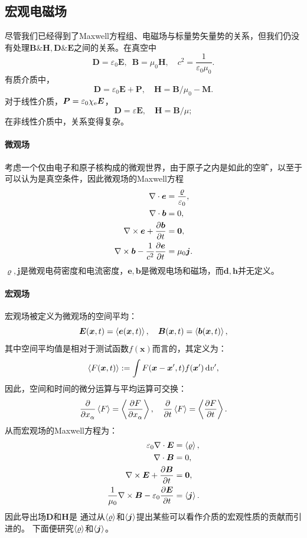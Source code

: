 \subsection{宏观电磁场}
尽管我们已经得到了Maxwell方程组、电磁场与标量势矢量势的关系，但我们仍没有处理$\bm B\&\bm H,\bm D\&\bm E$之间的关系。在真空中
\[
    \bm D=\varepsilon_0\bm E,\enspace\bm B=\mu_0\bm H,\quad c^2=\frac1{\varepsilon_0\mu_0}.
\]
有质介质中，
\[
    \bm D=\varepsilon_0\bm E+\bm P,\quad \bm H=\bm B/\mu_0-\bm M.
\]
对于线性介质，$\bm P=\varepsilon_0\chi_\mathrm e\bm E$，
\[
    \bm D=\varepsilon\bm E,\quad\bm H=\bm B/\mu;
\]
在非线性介质中，关系变得复杂。
\paragraph{微观场}
考虑一个仅由电子和原子核构成的微观世界，由于原子之内是如此的空旷，以至于可以认为是真空条件，因此微观场的Maxwell方程
\begin{align*}
    \div\bm e&=\frac\varrho{\varepsilon_0},\\
    \div\bm b&=0,\\
    \curl\bm e+\pv{\bm b}t&=\bm 0,\\
    \curl\bm b-\frac1{c^2}\pv{\bm e}t&=\mu_0\bm j.
\end{align*}
$\varrho,\bm j$是微观电荷密度和电流密度，$\bm e,\bm b$是微观电场和磁场，而$\bm d,\bm h$并无定义。
\paragraph{宏观场}
宏观场被定义为微观场的空间平均：
\[
    \bm E(\bm x,t)=\left\langle \bm e(\bm x,t)\right\rangle,\quad \bm B(\bm x,t)=\left\langle \bm b(\bm x,t)\right\rangle,
\]
其中空间平均值是相对于测试函数$f(\bm x)$而言的，其定义为：
\[
    \left\langle F(\bm x,t)\right\rangle:=\int F(\bm x-\bm x',t)f(\bm x')\mathop{}\!\mathrm{d} v',
\]
因此，空间和时间的微分运算与平均运算可交换：
\[
    \pp{x_\alpha}\ave{F}=\ave{\pv F{x_\alpha}},\quad\pp t\ave{F}=\ave{\pv Ft}.
\]
从而宏观场的Maxwell方程为： 
\begin{align}
    \label{eqn:average rho}
    \varepsilon_0\div\bm E&=\ave{\varrho},\\
    \notag
    \div\bm B&=0,\\
    \notag
    \curl\bm E+\pv{\bm B}t&=\bm0,\\
    \label{eqn:average j}
    \frac1{\mu_0}\curl\bm B-\varepsilon_0\pv{\bm E}t&=\ave{\bm j}.
\end{align}
因此导出场$\bm D$和$\bm H$是
通过从$\left\langle \varrho\right\rangle$和$\left\langle \bm j\right\rangle$提出某些可以看作介质的宏观性质的贡献而引进的。
下面便研究$\left\langle \varrho\right\rangle$和$\left\langle \bm j\right\rangle$。
